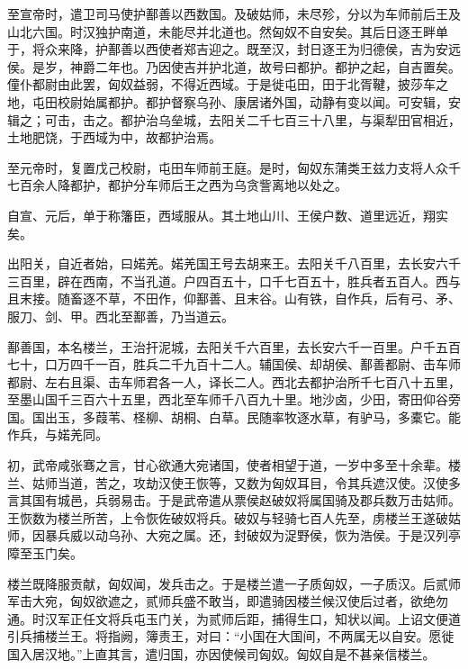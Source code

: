 \documentclass[12pt,UTF8]{ctexbook}
\begin{document}
至宣帝时，遣卫司马使护鄯善以西数国。及破姑师，未尽殄，分以为车师前后王及山北六国。时汉独护南道，未能尽并北道也。然匈奴不自安矣。其后日逐王畔单于，将众来降，护鄯善以西使者郑吉迎之。既至汉，封日逐王为归德侯，吉为安远侯。是岁，神爵二年也。乃因使吉并护北道，故号曰都护。都护之起，自吉置矣。僮仆都尉由此罢，匈奴益弱，不得近西域。于是徙屯田，田于北胥鞬，披莎车之地，屯田校尉始属都护。都护督察乌孙、康居诸外国，动静有变以闻。可安辑，安辑之；可击，击之。都护治乌垒城，去阳关二千七百三十八里，与渠犁田官相近，土地肥饶，于西域为中，故都护治焉。



至元帝时，复置戊己校尉，屯田车师前王庭。是时，匈奴东蒲类王兹力支将人众千七百余人降都护，都护分车师后王之西为乌贪訾离地以处之。



自宣、元后，单于称籓臣，西域服从。其土地山川、王侯户数、道里远近，翔实矣。



出阳关，自近者始，曰婼羌。婼羌国王号去胡来王。去阳关千八百里，去长安六千三百里，辟在西南，不当孔道。户四百五十，口千七百五十，胜兵者五百人。西与且末接。随畜逐不草，不田作，仰鄯善、且末谷。山有铁，自作兵，后有弓、矛、服刀、剑、甲。西北至鄯善，乃当道云。



鄯善国，本名楼兰，王治扞泥城，去阳关千六百里，去长安六千一百里。户千五百七十，口万四千一百，胜兵二千九百十二人。辅国侯、却胡侯、鄯善都尉、击车师都尉、左右且渠、击车师君各一人，译长二人。西北去都护治所千七百八十五里，至墨山国千三百六十五里，西北至车师千八百九十里。地沙卤，少田，寄田仰谷旁国。国出玉，多葭苇、柽柳、胡桐、白草。民随率牧逐水草，有驴马，多橐它。能作兵，与婼羌同。



初，武帝咸张骞之言，甘心欲通大宛诸国，使者相望于道，一岁中多至十余辈。楼兰、姑师当道，苦之，攻劫汉使王恢等，又数为匈奴耳目，令其兵遮汉使。汉使多言其国有城邑，兵弱易击。于是武帝遣从票侯赵破奴将属国骑及郡兵数万击姑师。王恢数为楼兰所苦，上令恢佐破奴将兵。破奴与轻骑七百人先至，虏楼兰王遂破姑师，因暴兵威以动乌孙、大宛之属。还，封破奴为浞野侯，恢为浩侯。于是汉列亭障至玉门矣。



楼兰既降服贡献，匈奴闻，发兵击之。于是楼兰遣一子质匈奴，一子质汉。后贰师军击大宛，匈奴欲遮之，贰师兵盛不敢当，即遣骑因楼兰候汉使后过者，欲绝勿通。时汉军正任文将兵屯玉门关，为贰师后距，捕得生口，知状以闻。上诏文便道引兵捕楼兰王。将指阙，簿责王，对曰：“小国在大国间，不两属无以自安。愿徙国入居汉地。”上直其言，遣归国，亦因使候司匈奴。匈奴自是不甚亲信楼兰。
\end{document}
